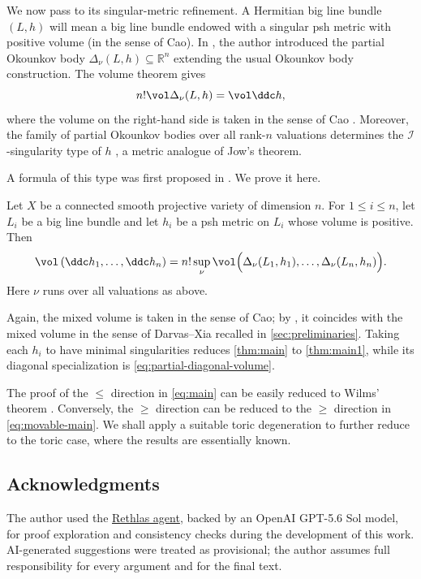 \documentclass[11pt,a4paper]{amsart}
\begin{document}
We now pass to its singular-metric refinement.  A Hermitian big line bundle $(L,h)$ will mean a big line bundle endowed with a singular psh metric with positive volume (in the sense of Cao). In \cite{Xia21}, the author introduced the partial Okounkov body
$\Delta_\nu(L,h)\subseteq\mathbb R^n$ extending the usual Okounkov body construction. The volume theorem \cite[Theorem~A]{Xia21} gives
\begin{equation}\label{eq:partial-diagonal-volume}
 n!\vol \Delta_\nu(L,h) =\vol \ddc h,
\end{equation}
where the volume on the right-hand side is taken in the sense of Cao \cite{Cao14}.
Moreover, the family of partial Okounkov bodies over all rank-$n$ valuations determines the $\mathcal{I}$-singularity type of $h$
\cite[Theorem~B]{Xia21}, a metric analogue of Jow's theorem.

A formula of this type was first proposed in \cite[Conjecture~8.8]{Xia21}. We prove it here.
\begin{theorem}\label{thm:main}
Let $X$ be a connected smooth projective variety of dimension $n$.  For $1\leq i\leq n$, let $L_i$ be a big line bundle and let $h_i$ be a psh metric on $L_i$ whose volume is positive. Then
\begin{equation}\label{eq:main}
 \vol\left(\ddc h_1,\ldots,\ddc h_n\right)=n!\sup_\nu\vol\Bigl(\Delta_\nu(L_1,h_1),\ldots,\Delta_\nu(L_n,h_n)\Bigr).
\end{equation}
Here $\nu$ runs over all valuations as above.
\end{theorem}
Again, the mixed volume is taken in the sense of Cao; by \cite[Definition~3.2, Proposition~3.3, and Theorem~3.5]{Xiabdiv}, it coincides with the mixed volume in the sense of Darvas--Xia recalled in \cref{sec:preliminaries}. Taking each $h_i$ to have minimal singularities reduces \cref{thm:main} to \cref{thm:main1}, while its diagonal specialization is \eqref{eq:partial-diagonal-volume}.

The proof of the $\leq$ direction in \eqref{eq:main} can be easily reduced to Wilms' theorem \cite[Theorem~1.1]{Wil25}. Conversely, the $\geq$ direction can be reduced to the $\geq$ direction in \eqref{eq:movable-main}. We shall apply a suitable toric degeneration to further reduce to the toric case, where the results are essentially known.

\subsection*{Acknowledgments}
The author used the \href{https://github.com/frenzymath/Rethlas}{Rethlas agent}, backed by an OpenAI GPT-5.6 Sol model, for proof exploration and consistency checks during the development of this work.  AI-generated suggestions were treated as
provisional; the author assumes full responsibility for every argument and for the final text.
\end{document}
